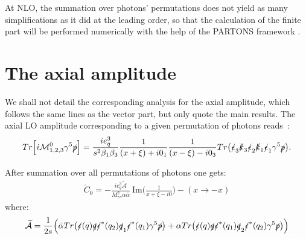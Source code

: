 \documentclass[aps,prd,superscriptaddress,floatfix,showpacs]{revtex4}
\begin{document}
 At NLO, the summation over photons' permutations does not yield as many simplifications as it did at the leading order, so that the calculation of the finite part will be performed numerically with the help of the PARTONS framework \cite{Berthou:2015oaw}.
%
\section{The axial amplitude}
We shall not detail the corresponding analysis for the axial amplitude, which follows the same lines as the vector part, but only quote the main results. The axial LO amplitude corresponding to a given permutation of photons reads~\cite{Pedrak:2017cpp}:
\begin{equation}
    Tr\Big[ i\mathcal{M}^0_{1,2,3} \gamma^5 \slashed{p} \Big] = 
    \frac{ie_q^3}{s^2\beta_1\beta_3} \frac{1}{(x+\xi)+ i0_1}\frac{1}{(x-\xi) - i0_3} 
    Tr\big( \slashed{\epsilon}_3 \slashed{k}_3 \slashed{\epsilon}_2 \slashed{k}_1 \slashed{\epsilon}_1 \gamma^5 \slashed{p} \big).
\end{equation}

After summation over all permutations of photons one gets:
\begin{equation}
\begin{aligned}
\widetilde{C}_0  = -\frac{ie_q^3\widetilde{\mathcal{A}} }{ M^2_{\gamma\gamma} \alpha \bar{\alpha} } \: \mathrm{Im} \Big( \frac{1}{x+\xi - i0}  \Big) - ( x \rightarrow -x)
\end{aligned}
\end{equation}
where:
\begin{align}
\widetilde{\mathcal{A}} = \frac{1}{2s}\Big( \bar{\alpha} Tr\big( \slashed{\epsilon}(q) \slashed{q} \slashed{\epsilon}^*(q_2) \slashed{q}_1 \slashed{\epsilon}^*(q_1) \gamma^5 \slashed{p} \big) + {\alpha} Tr\big( \slashed{\epsilon}(q) \slashed{q} \slashed{\epsilon}^*(q_1) \slashed{q}_2 \slashed{\epsilon}^*(q_2) \gamma^5 \slashed{p} \big) \Big)
\end{align}
\end{document}
